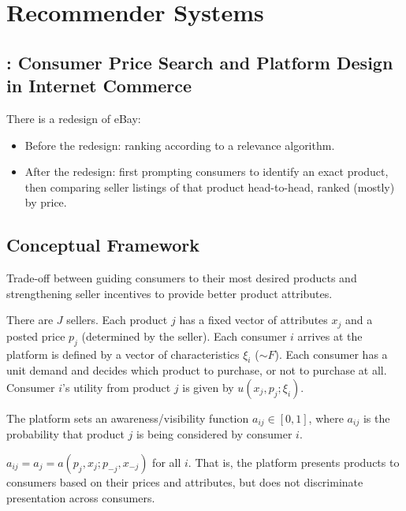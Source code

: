 \chapter{Recommender Systems}
\section{\cite{dinerstein2018consumer}: Consumer Price Search and Platform Design in Internet Commerce}
There is a redesign of eBay:
\begin{itemize}
    \item Before the redesign: ranking according to a relevance algorithm.
    \item After the redesign: first prompting consumers to identify an exact product, then comparing seller listings of that product  head-to-head, ranked (mostly) by price.
\end{itemize}

\section{Conceptual Framework}
Trade-off between guiding consumers to their most desired products and strengthening seller  incentives to provide better product attributes.

There are $J$ sellers. Each product $j$ has a fixed vector of attributes $x_j$ and a posted price $p_j$ (determined by the seller). Each consumer $i$ arrives at the platform is defined by a vector of characteristics $\xi_i$ ($\sim F$). Each consumer has a unit demand and decides which product to purchase, or not to purchase at all. Consumer $i$'s utility from product $j$ is given by $u(x_j,p_j;\xi_i)$.

The platform sets an awareness/visibility function $a_{ij}\in[0,1]$, where $a_{ij}$ is the probability that product $j$ is being considered by consumer $i$.
\begin{assumption}
    $a_{ij}=a_j=a(p_j,x_j;p_{-j},x_{-j})$ for all $i$. That is, the platform presents products to consumers based on their prices and attributes, but does not discriminate presentation across consumers.
\end{assumption}